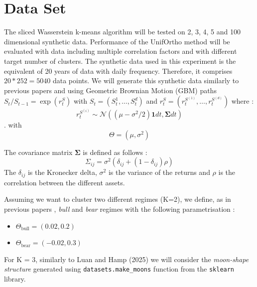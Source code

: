\documentclass[12pt,a4paper]{report}
\begin{document}
\section{Data Set}
The sliced Wasserstein k-means algorithm will be tested on 2, 3, 4, 5 and 100 dimensional synthetic data. Performance of the UnifOrtho method will be evaluated with data including multiple correlation factors
and with different target number of clusters. The synthetic data used in this experiment is the equivalent of 20 years of data with daily frequency. 
Therefore, it comprises $20*252 = 5040$ data points.
We will generate this synthetic data similarly to previous papers \cite{HorvathEtAl2024} and \cite{LuanHamp2025} using Geometric Brownian Motion (GBM) paths $S_t/S_{t-1} = \exp(r^S_t)$ with $S_t = (S_t^1, \dots, S_t^d)$ and $r^S_t = (r^{S^{(1)}}_{t}, \dots, r^{S^{(d)}}_{t})$ 
where : 
\begin{equation}
    r^{S^{(i)}}_{t} \sim \mathcal{N}\left((\mu-\sigma^2/2)\bm{1}dt, \bm{\Sigma} dt \right)
\end{equation}.
with 
\begin{equation}
\Theta = (\mu, \sigma^2)
\end{equation}

The covariance matrix $\bm{\Sigma}$ is defined as follows :
\begin{equation}
\Sigma_{ij} = \sigma^2 \left( \delta_{ij} + (1- \delta_{ij})\rho \right)
\end{equation}
The $\delta_{ij}$ is the Kronecker delta, $\sigma^2$ is the variance of the returns and $\rho$ is the correlation between the different assets.

Assuming we want to cluster two different regimes (K=2), we define, as in previous papers \cite{LuanHamp2025}, \textit{bull} and \textit{bear} regimes with the following parametrisation : 
\begin{itemize}
    \item $\Theta_{\text{bull}} = (0.02, 0.2)$
    \item $\Theta_{\text{bear}} = (-0.02, 0.3)$
\end{itemize}
For K = 3, similarly to Luan and Hamp (2025) \cite{LuanHamp2025} we will consider the \textit{moon-shape structure} generated using \texttt{datasets.make\_moons} function from the \texttt{sklearn} library.
\end{document}
